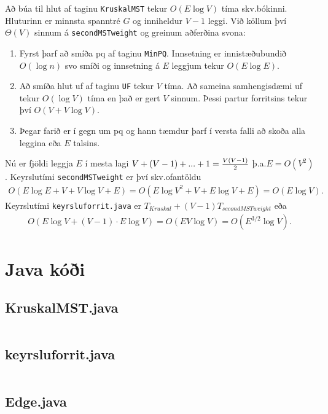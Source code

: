 \documentclass[a4paper,oneside]{article}
\begin{document}
\noindent
Að búa til hlut af taginu \texttt{KruskalMST} tekur $O(E \log V)$ tíma skv.\@ bókinni. Hluturinn er minnsta spanntré $G$ og inniheldur $V-1$ leggi. Við köllum því $\Theta(V)$ sinnum á \texttt{secondMSTweight} og greinum aðferðina svona:
\begin{enumerate}
    \item Fyrst þarf að smíða pq af taginu \texttt{MinPQ}. Innsetning er innistæðubundið $O(\log n)$ svo smíði og innsetning á $E$ leggjum tekur $O(E \log E)$.
    \item Að smíða hlut uf af taginu \texttt{UF} tekur $V$ tíma. Að sameina samhengisdæmi uf tekur $O(\log V)$ tíma en það er gert $V$ sinnum. Þessi partur forritsins tekur því $O(V +  V \log V)$.
    \item Þegar farið er í gegn um pq og hann tæmdur þarf í versta falli að skoða alla leggina eða $E$ talsins.
\end{enumerate}
Nú er fjöldi leggja $E$ í mesta lagi $V + (V-1) + ... + 1 = {V(V-1) \over 2}$ þ.a.\@ $E = O(V^2)$. Keyrslutími \texttt{secondMSTweight} er því skv.\@ ofantöldu
\begin{align*}
    O(E \log E + V + V \log V + E) = O(E \log V^2 + V + E \log V + E) = O(E \log V).
\end{align*}
Keyrslutími \texttt{keyrsluforrit.java} er $T_{Kruskal} + (V-1) T_{secondMSTweight}$ eða
\begin{align*}
    O(E \log V + (V-1) \cdot E \log V) = O(EV \log V) = O(E^{3/2} \log V).
\end{align*}


\pagebreak
\section{Java kóði}
\subsection{KruskalMST.java}
\inputminted[]{java}{../KruskalMST.java}

\subsection{keyrsluforrit.java}
\inputminted[]{java}{../keyrsluforrit.java}

\subsection{Edge.java}
\inputminted[firstline=91,firstnumber=91,lastline=131]{java}{../Edge.java}
\end{document}
